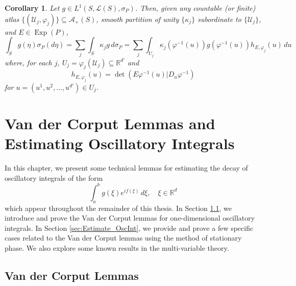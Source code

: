 \documentclass[11pt, letter]{book}
\newtheorem{corollary}[theorem]{Corollary}
\newcommand\Exp{\operatorname{Exp}}
\renewcommand\det{\operatorname{det}}
\begin{document}
\begin{framed}
\begin{corollary}\label{cor:IntegralFormula}
Let $g\in L^1(S,\mathcal{L}(S),\sigma_P)$. Then, given any  countable (or finite) atlas $\{(\mathcal{U}_j,\varphi_j)\}\subseteq\mathcal{A}_+(S)$,  smooth partition of unity $\{\kappa_j\}$ subordinate to $\{\mathcal{U}_j\}$, and $E\in\Exp(P)$,
\begin{equation*}
\int_S g(\eta)\sigma_P(d\eta)=\sum_{j}\int_S \kappa_jg\,d\sigma_P=\sum_j\int_{U_j}\kappa_j(\varphi^{-1}(u))g(\varphi^{-1}(u))h_{E,\varphi_j}(u)\,du
\end{equation*}
where, for each $j$, $U_j=\varphi_j(\mathcal{U}_j)\subseteq\mathbb{R}^{d'}$ and
\begin{equation*}
    h_{E,\varphi_j}(u)=\det(E\varphi^{-1}(u)\vert D_u\varphi^{-1})
\end{equation*}
for $u=(u^1,u^2,\dots,u^{d'})\in U_j$. 
\end{corollary}
\end{framed}















\chapter{Van der Corput Lemmas and Estimating Oscillatory Integrals}\label{chap:VanDerCorput}


In this chapter, we present some technical lemmas for estimating the decay of oscillatory integrals of the form
\begin{equation*}
    \int^b_a g(\xi) e^{if(\xi)}\,d\xi, \quad \xi \in \mathbb{R}^d
\end{equation*}
which appear throughout the remainder of this thesis. In Section \ref{sec:VanDerCorput}, we introduce and prove the Van der Corput lemmas for one-dimensional oscillatory integrals. In Section \ref{sec:Estimate_OscInt}, we provide and prove a few specific cases related to the Van der Corput lemmas using the method of stationary phase. We also explore some known results in the multi-variable theory. 

\section{Van der Corput Lemmas}\label{sec:VanDerCorput}
\end{document}
